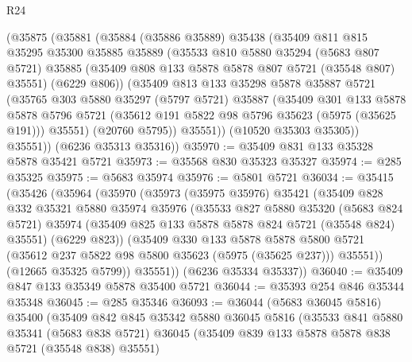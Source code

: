 \begin{lexlean}{R24}
\begin{coremodule}
      (@35875
        (@35881
          (@35884
            (@35886 @35889)
            @35438
            (@35409
              @811
              @815
              @35295
              @35300
              @35885
              @35889
              (@35533
                @810
                @5880
                @35294
                (@5683 @807 @5721)
                @35885
                (@35409 @808 @133 @5878 @5878 @807 @5721 (@35548 @807) @35551)
                (@6229 @806))
              (@35409
                @813
                @133
                @35298
                @5878
                @35887
                @5721
                (@35765
                  @303
                  @5880
                  @35297
                  (@5797 @5721)
                  @35887
                  (@35409
                    @301
                    @133
                    @5878
                    @5878
                    @5796
                    @5721
                    (@35612 @191 @5822 @98 @5796 @35623 (@5975 (@35625 @191)))
                    @35551)
                  (@20760 @5795))
                @35551))
            (@10520 @35303 @35305))
          @35551))
      (@6236 @35313 @35316))
@35970 := @35409 @831 @133 @35328 @5878 @35421 @5721
@35973 := @35568 @830 @35323 @35327
@35974 := @285 @35325
@35975 := @5683 @35974
@35976 := @5801 @5721
@36034 := @35415
    (@35426
      (@35964
        (@35970
          (@35973
            (@35975 @35976)
            @35421
            (@35409
              @828
              @332
              @35321
              @5880
              @35974
              @35976
              (@35533
                @827
                @5880
                @35320
                (@5683 @824 @5721)
                @35974
                (@35409 @825 @133 @5878 @5878 @824 @5721 (@35548 @824) @35551)
                (@6229 @823))
              (@35409
                @330
                @133
                @5878
                @5878
                @5800
                @5721
                (@35612 @237 @5822 @98 @5800 @35623 (@5975 (@35625 @237)))
                @35551))
            (@12665 @35325 @5799))
          @35551))
      (@6236 @35334 @35337))
@36040 := @35409 @847 @133 @35349 @5878 @35400 @5721
@36044 := @35393 @254 @846 @35344 @35348
@36045 := @285 @35346
@36093 := @36044
    (@5683 @36045 @5816)
    @35400
    (@35409
      @842
      @845
      @35342
      @5880
      @36045
      @5816
      (@35533
        @841
        @5880
        @35341
        (@5683 @838 @5721)
        @36045
        (@35409 @839 @133 @5878 @5878 @838 @5721 (@35548 @838) @35551)

\end{coremodule}
\end{lexlean}
